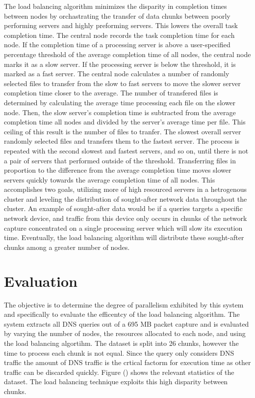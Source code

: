 \documentclass{article}
\begin{document}
\begin{multicols}{2}
The load balancing algorithm minimizes the disparity in completion times between nodes by orchastrating the transfer of data chunks between poorly performing servers and highly preforming servers. This lowers the overall task completion time.  The central node records the task completion time for each node.  If the completion time of a processing server is above a user-specified percentage threshold of the average completion time of all nodes, the central node marks it as a slow server. If the processing server is below the threshold, it is marked as a fast server.  The central node calculates a number of randomly selected files to transfer from the slow to fast servers to move the slower server completion time closer to the average. The number of transfered files is determined by calculating the average time processing each file on the slower node.  Then, the slow server's completion time is subtracted from the average completion time all nodes and divided by the server's average time per file. This ceiling of this result is the number of files to tranfer. The slowest overall server randomly selected files and transfers them to the fastest server.  The process is repeated with the second slowest and fastest servers, and so on, until there is not a pair of servers that performed outside of the threshold.  Transferring files in proportion to the difference from the average completion time moves slower servers quickly towards the average completion time of all nodes.  This accomplishes two goals, utilizing more of high resourced servers in a hetrogenous cluster and leveling the distribution of sought-after network data throughout the cluster.  An example of sought-after data would be if a queries targets a specific network device, and traffic from this device only occurs in chunks of the network capture concentrated on a single processing server which will slow its execution time.  Eventually, the load balancing algorithm will distribute these sought-after chunks among a greater number of nodes. 

\section*{Evaluation} 


The objective is to determine the degree of parallelism exhibited by this system and specifically to evaluate the efficentcy of the load balancing algorithm. The system extracts all DNS queries out of a 695 MB packet capture and is evaluated by varying the number of nodes, the resources allocated to each node, and using the load balancing algortihm.  The dataset is split into 26 chunks, however the time to process each chunk is not equal.  Since the query only considers DNS traffic the amount of DNS traffic is the crtical factorm for execution time as other traffic can be discarded quickly.  Figure () shows the relevant statistics of the dataset.  The load balancing technique exploits this high disparity between chunks.  


\end{multicols}
\end{document}
